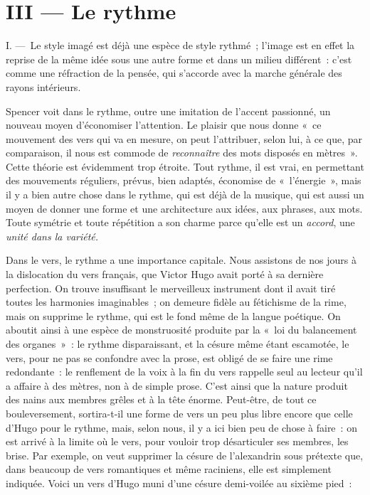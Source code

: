 \documentclass[french,twoside]{book} %
\begin{document}
\section[{III — Le rythme}]{III — Le rythme}
\noindent I. — Le style imagé est déjà une espèce de style rythmé ; l’image est en effet la reprise de la même idée sous une autre forme et dans un milieu différent : c’est comme une réfraction de la pensée, qui s’accorde avec la marche générale des rayons intérieurs.\par
Spencer voit dans le rythme, outre une imitation de l’accent passionné, un nouveau moyen d’économiser l’attention. Le plaisir que nous donne « ce mouvement des vers qui va en mesure, on peut l’attribuer, selon lui, à ce que, par comparaison, il nous est commode de \emph{reconnaître} des mots disposés en mètres ». Cette théorie est évidemment trop étroite. Tout rythme, il est vrai, en permettant des mouvements réguliers, prévus, bien adaptés, économise de « l’énergie », mais il y a bien autre chose dans le rythme, qui est déjà de la musique, qui est aussi un moyen de donner une forme et une architecture aux idées, aux phrases, aux mots. Toute symétrie et toute répétition a son charme parce qu’elle est un \emph{accord}, une \emph{unité dans la variété.}\par
Dans le vers, le rythme a une importance capitale. Nous assistons de nos jours à la dislocation du vers français, que Victor Hugo avait porté à sa dernière perfection. On trouve insuffisant le merveilleux instrument dont il avait tiré toutes les harmonies imaginables ; on demeure fidèle au fétichisme de la rime, mais on supprime le rythme, qui est le fond même de la langue poétique. On aboutit ainsi à une espèce de monstruosité produite par la « loi du balancement des organes » : le rythme disparaissant, et la césure même étant escamotée, le vers, pour ne pas se confondre avec la prose, est obligé de se faire une rime redondante : le renflement de la voix à la fin du vers rappelle seul au lecteur qu’il a affaire à des mètres, non à de simple prose. C’est ainsi que la nature produit des nains aux membres grêles et à la tête énorme. Peut-être, de tout ce bouleversement, sortira-t-il une forme de vers un peu plus libre encore que celle d’Hugo pour le rythme, mais, selon nous, il y a ici bien peu de chose à faire : on est arrivé à la limite où le vers, pour vouloir trop désarticuler ses membres, les brise. Par exemple, on veut supprimer la césure de l’alexandrin sous prétexte que, dans beaucoup de vers romantiques et même raciniens, elle est simplement indiquée. Voici un vers d’Hugo muni d’une césure demi-voilée au sixième pied :\par
\end{document}
